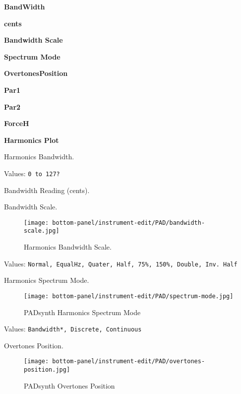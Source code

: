    \begin{enumber}
      \item \textbf{BandWidth}
      \item \textbf{cents}
      \item \textbf{Bandwidth Scale}
      \item \textbf{Spectrum Mode}
      \item \textbf{OvertonesPosition}
      \item \textbf{Par1}
      \item \textbf{Par2}
      \item \textbf{ForceH}
      \item \textbf{Harmonics Plot}
   \end{enumber}

   \setcounter{ItemCounter}{0}      %

   Harmonics Bandwidth.

   Values: \texttt{0 to 127?}

   Bandwidth Reading (cents).

   Bandwidth Scale.

\begin{figure}[H]
   \centering 
   \texttt{[image: bottom-panel/instrument-edit/PAD/bandwidth-scale.jpg]}
   \caption{Harmonics Bandwidth Scale.}
   \label{fig:padsynth_harmonics_bandwidth_scale}
\end{figure}

   Values: \texttt{Normal, EqualHz, Quater, Half, 75\%, 150\%, Double, Inv.  Half}

   Harmonics Spectrum Mode.

\begin{figure}[H]
   \centering 
   \texttt{[image: bottom-panel/instrument-edit/PAD/spectrum-mode.jpg]}
   \caption{PADsynth Harmonics Spectrum Mode}
   \label{fig:padsynth_harmonics_spectrum mode}
\end{figure}

   Values: \texttt{Bandwidth*, Discrete, Continuous}

   Overtones Position.

\begin{figure}[H]
   \centering 
   \texttt{[image: bottom-panel/instrument-edit/PAD/overtones-position.jpg]}
   \caption{PADsynth Overtones Position}
   \label{fig:padsynth_overtones_position}
\end{figure}

